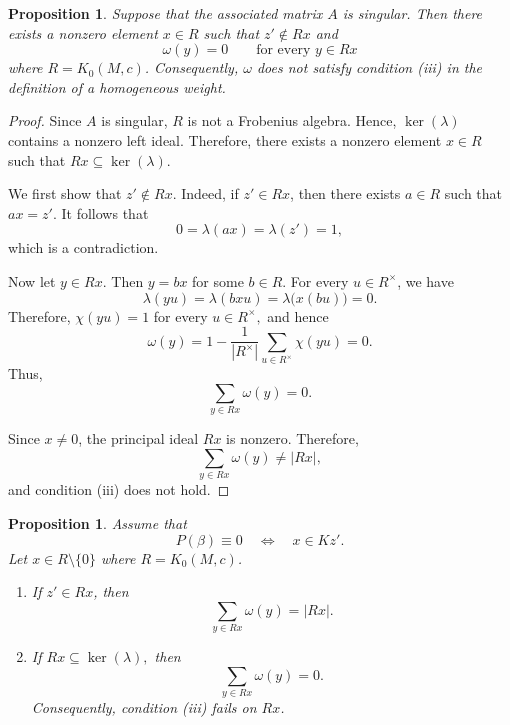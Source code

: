 \documentclass[11pt,reqno]{amsart}
\theoremstyle{plain}
\newtheorem{prop}[thm]{Proposition}
\theoremstyle{remark}
\theoremstyle{definition}
\begin{document}
\begin{prop}\label{SingularMatrixNotHomogeneous}
Suppose that the associated matrix \(A\) is singular. Then there exists a
nonzero element \(x\in R\) such that
\(z'\notin Rx\)
and
\[
\omega(y)=0
\qquad
\text{for every }y\in Rx
\]
where \(R=K_0(M,c)\).
Consequently, \(\omega\) does not satisfy condition {\rm(iii)} in the
definition of a homogeneous weight.
\end{prop}

\begin{proof}
Since \(A\) is singular, \(R\) is not a Frobenius algebra. 
Hence, \(\ker(\lambda)\) contains a nonzero left ideal.
Therefore, there exists a nonzero element \(x\in R\) such that
\(Rx\subseteq\ker(\lambda).\)

We first show that
\(z'\notin Rx.\)
Indeed, if \(z'\in Rx\), then there exists \(a\in R\) such that
\(ax=z'.\)
It follows that
\[
0=\lambda(ax)=\lambda(z')=1,
\]
which is a contradiction.

Now let \(y\in Rx\). Then \(y=bx\) for some \(b\in R\). For every
\(u\in R^\times\), we have
\[\lambda(yu)=\lambda(bxu)=\lambda\bigl(x(bu)\bigr)=0.\]
Therefore,
\(\chi(yu)=1\) for every \(u\in R^\times,\)
and hence
\[
\omega(y)
=
1-\frac{1}{|R^\times|}
\sum_{u\in R^\times}\chi(yu)
=
0.
\]
Thus,
\[
\sum_{y\in Rx}\omega(y)=0.
\]

Since \(x\neq0\), the principal ideal \(Rx\) is nonzero. Therefore,
\[
\sum_{y\in Rx}\omega(y)\neq |Rx|,
\]
and condition {\rm(iii)} does not hold.
\end{proof}

\begin{prop}\label{PrincipalIdealAverage}
Assume that
\[
P(\beta)\equiv0
\quad\Longleftrightarrow\quad
x\in Kz'.
\]
Let \(x\in R\setminus\{0\}\) where \(R=K_0(M,c)\).

\begin{enumerate}
\item[\rm(i)]
If \(z'\in Rx\), then
\[
\sum_{y\in Rx}\omega(y)=|Rx|.
\]

\item[\rm(ii)]
If
\(Rx\subseteq\ker(\lambda),\)
then
\[
\sum_{y\in Rx}\omega(y)=0.
\]
Consequently, condition {\rm(iii)} fails on \(Rx\).
\end{enumerate}
\end{prop}
\end{document}
